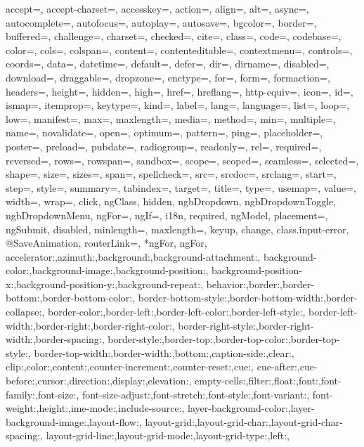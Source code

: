 {{            accept=, accept-charset=, accesskey=, action=, align=, alt=, async=, autocomplete=, autofocus=, autoplay=, autosave=, bgcolor=, border=, buffered=, challenge=, charset=, checked=, cite=, class=, code=, codebase=, color=, cols=, colspan=, content=, contenteditable=, contextmenu=, controls=, coords=, data=, datetime=, default=, defer=, dir=, dirname=, disabled=, download=, draggable=, dropzone=, enctype=, for=, form=, formaction=, headers=, height=, hidden=, high=, href=, hreflang=, http-equiv=, icon=, id=, ismap=, itemprop=, keytype=, kind=, label=, lang=, language=, list=, loop=, low=, manifest=, max=, maxlength=, media=, method=, min=, multiple=, name=, novalidate=, open=, optimum=, pattern=, ping=, placeholder=, poster=, preload=, pubdate=, radiogroup=, readonly=, rel=, required=, reversed=, rows=, rowspan=, sandbox=, scope=, scoped=, seamless=, selected=, shape=, size=, sizes=, span=, spellcheck=, src=, srcdoc=, srclang=, start=, step=, style=, summary=, tabindex=, target=, title=, type=, usemap=, value=, width=, wrap=, click, ngClass, hidden, ngbDropdown, ngbDropdownToggle, ngbDropdownMenu, ngFor=, ngIf=, i18n, required, ngModel, placement=, ngSubmit, disabled, minlength=, maxlength=, keyup, change, class.input-error, @SaveAnimation, routerLink=, *ngFor, ngFor,
            accelerator:,azimuth:,background:,background-attachment:,
            background-color:,background-image:,background-position:,
            background-position-x:,background-position-y:,background-repeat:,
            behavior:,border:,border-bottom:,border-bottom-color:,
            border-bottom-style:,border-bottom-width:,border-collapse:,
            border-color:,border-left:,border-left-color:,border-left-style:,
            border-left-width:,border-right:,border-right-color:,
            border-right-style:,border-right-width:,border-spacing:,
            border-style:,border-top:,border-top-color:,border-top-style:,
            border-top-width:,border-width:,bottom:,caption-side:,clear:,
            clip:,color:,content:,counter-increment:,counter-reset:,cue:,
            cue-after:,cue-before:,cursor:,direction:,display:,elevation:,
            empty-cells:,filter:,float:,font:,font-family:,font-size:,
            font-size-adjust:,font-stretch:,font-style:,font-variant:,
            font-weight:,height:,ime-mode:,include-source:,
            layer-background-color:,layer-background-image:,layout-flow:,
            layout-grid:,layout-grid-char:,layout-grid-char-spacing:,
            layout-grid-line:,layout-grid-mode:,layout-grid-type:,left:,
}}
